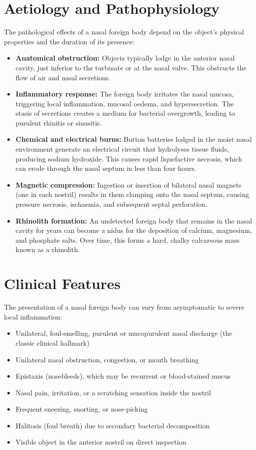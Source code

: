 \section*{Aetiology and Pathophysiology}
The pathological effects of a nasal foreign body depend on the object's physical properties and the duration of its presence:
\begin{itemize}
    \item \textbf{Anatomical obstruction:} Objects typically lodge in the anterior nasal cavity, just inferior to the turbinate or at the nasal valve. This obstructs the flow of air and nasal secretions.
    \item \textbf{Inflammatory response:} The foreign body irritates the nasal mucosa, triggering local inflammation, mucosal oedema, and hypersecretion. The stasis of secretions creates a medium for bacterial overgrowth, leading to purulent rhinitis or sinusitis.
    \item \textbf{Chemical and electrical burns:} Button batteries lodged in the moist nasal environment generate an electrical circuit that hydrolyses tissue fluids, producing sodium hydroxide. This causes rapid liquefactive necrosis, which can erode through the nasal septum in less than four hours.
    \item \textbf{Magnetic compression:} Ingestion or insertion of bilateral nasal magnets (one in each nostril) results in them clamping onto the nasal septum, causing pressure necrosis, ischaemia, and subsequent septal perforation.
    \item \textbf{Rhinolith formation:} An undetected foreign body that remains in the nasal cavity for years can become a nidus for the deposition of calcium, magnesium, and phosphate salts. Over time, this forms a hard, chalky calcareous mass known as a rhinolith.
\end{itemize}

\section*{Clinical Features}
The presentation of a nasal foreign body can vary from asymptomatic to severe local inflammation:
\begin{itemize}
    \item Unilateral, foul-smelling, purulent or mucopurulent nasal discharge (the classic clinical hallmark)
    \item Unilateral nasal obstruction, congestion, or mouth breathing
    \item Epistaxis (nosebleeds), which may be recurrent or blood-stained mucus
    \item Nasal pain, irritation, or a scratching sensation inside the nostril
    \item Frequent sneezing, snorting, or nose-picking
    \item Halitosis (foul breath) due to secondary bacterial decomposition
    \item Visible object in the anterior nostril on direct inspection
\end{itemize}

